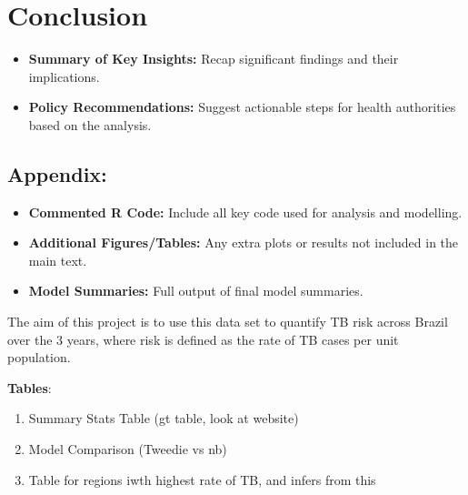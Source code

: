 \documentclass[
  11pt,
  a4paper,11pt]{article}
\providecommand{\tightlist}{%
  \setlength{\itemsep}{0pt}\setlength{\parskip}{0pt}}
\begin{document}
\section{Conclusion}\label{conclusion}

\begin{itemize}
\tightlist
\item
  \textbf{Summary of Key Insights:} Recap significant findings and their
  implications.
\end{itemize}

\begin{itemize}
\tightlist
\item
  \textbf{Policy Recommendations:} Suggest actionable steps for health
  authorities based on the analysis.
\end{itemize}

\subsection{Appendix:}\label{appendix}

\begin{itemize}
\tightlist
\item
  \textbf{Commented R Code:} Include all key code used for analysis and
  modelling.
\end{itemize}

\begin{itemize}
\tightlist
\item
  \textbf{Additional Figures/Tables:} Any extra plots or results not
  included in the main text.
\end{itemize}

\begin{itemize}
\tightlist
\item
  \textbf{Model Summaries:} Full output of final model summaries.
\end{itemize}

The aim of this project is to use this data set to quantify TB risk
across Brazil over the 3 years, where risk is defined as the rate of TB
cases per unit population.

\textbf{Tables}:

\begin{enumerate}
\def\labelenumi{\arabic{enumi}.}
\tightlist
\item
  Summary Stats Table (gt table, look at website)
\item
  Model Comparison (Tweedie vs nb)
\item
  Table for regions iwth highest rate of TB, and infers from this
\end{enumerate}
\end{document}
